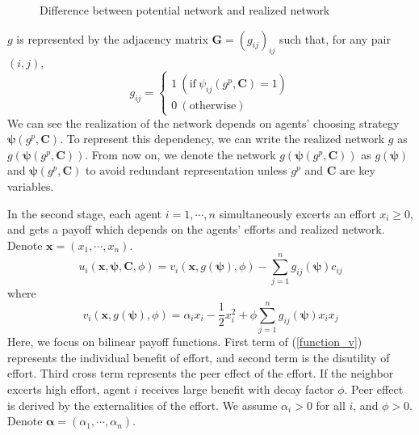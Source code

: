 \documentclass[12pt]{article}
\theoremstyle{definition}
\begin{document}
\begin{figure}[h]
\caption{Difference between potential network and realized network} \label{fig:dif}
\end{figure}

$g$ is represented by the adjacency matrix $\bm{G} = {(g_{ij})}_{ij}$ such that, for any pair $(i,j)$,
\[ g_{ij} = 
	\begin{cases}
		1 \  (\text{if} \  \psi_{ij}(g^p, {\bm{C}}) = 1 ) \\
		0 \  (\text{otherwise})
	\end{cases} \]
We can see the realization of the network depends on agents' choosing strategy $\bm{\psi}(g^p, \bm{C})$.
To represent this dependency, we can write the realized network $g$ as $g(\bm{\psi}(g^p, \bm{C}))$.
From now on, we denote the network $g(\bm{\psi}(g^p, \bm{C}))$ as $g(\bm{\psi})$ and $\bm{\psi}(g^p, \bm{C})$ to avoid redundant representation unless $g^p$ and $\bm{C}$ are key variables.

In the second stage, each agent $i = 1, \cdots, n$ simultaneously excerts an effort $x_i \ge 0$, and gets a payoff which depends on the agents' efforts and realized network.
Denote $\bm{x} = (x_1, \cdots, x_n)$.
\[ u_i(\bm{x}, \bm{\psi}, \bm{C}, \phi) = v_i(\bm{x}, g(\bm{\psi}), \phi) - \sum_{j=1}^n g_{ij}(\bm{\psi}) c_{ij} \]
where
\begin{equation}
\label{function_v}
	v_i(\bm{x}, g(\bm{\psi}), \phi) = \alpha_i x_i - \frac{1}{2} x_i^2 + \phi \sum_{j=1}^n g_{ij}(\bm{\psi}) x_i x_j
\end{equation}
Here, we focus on bilinear payoff functions.
First term of (\ref{function_v}) represents the individual benefit of effort, and second term is the disutility of effort.
Third cross term represents the peer effect of the effort.
If the neighbor excerts high effort, agent $i$ receives large benefit with decay factor $\phi$.
Peer effect is derived by the externalities of the effort.
We assume $\alpha_i > 0$ for all $i$, and $\phi > 0$.
Denote $\bm{\alpha} = (\alpha_1, \cdots, \alpha_n)$.
\end{document}
